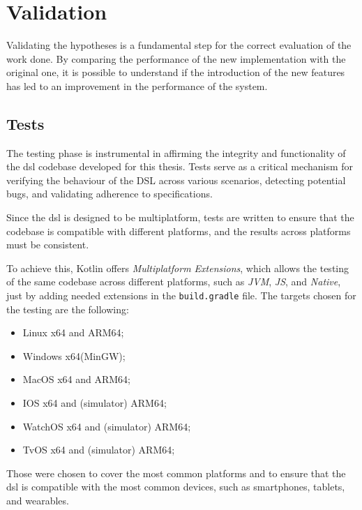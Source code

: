 
\chapter{Validation}
\label{ch:validation}
Validating the hypotheses is a fundamental step for the correct evaluation of the work done.
By comparing the performance of the new implementation with the original one, it is possible to understand if the
introduction of the new features has led to an improvement in the performance of the system.
\section{Tests}
\label{sec:tests}
The testing phase is instrumental in affirming the integrity and functionality of the \ac{dsl} codebase developed for this thesis.
Tests serve as a critical mechanism for verifying the behaviour of the DSL across various scenarios, detecting potential bugs,
and validating adherence to specifications.

Since the \ac{dsl} is designed to be multiplatform, tests are written to ensure that the codebase is compatible with
different platforms, and the results across platforms must be consistent.

To achieve this, Kotlin offers \emph{Multiplatform Extensions}, which allows the testing of the same codebase across
different platforms, such as \emph{JVM}, \emph{JS}, and \emph{Native}, just by adding needed extensions in the \texttt{build.gradle} file.
The targets chosen for the testing are the following:
\begin{itemize}
    \item Linux x64 and ARM64;
    \item Windows x64(MinGW);
    \item MacOS x64 and ARM64;
    \item IOS x64 and (simulator) ARM64;
    \item WatchOS x64 and (simulator) ARM64;
    \item TvOS x64 and (simulator) ARM64;
\end{itemize}

Those were chosen to cover the most common platforms and to ensure that the \ac{dsl} is compatible with the most common
devices, such as smartphones, tablets, and wearables.

